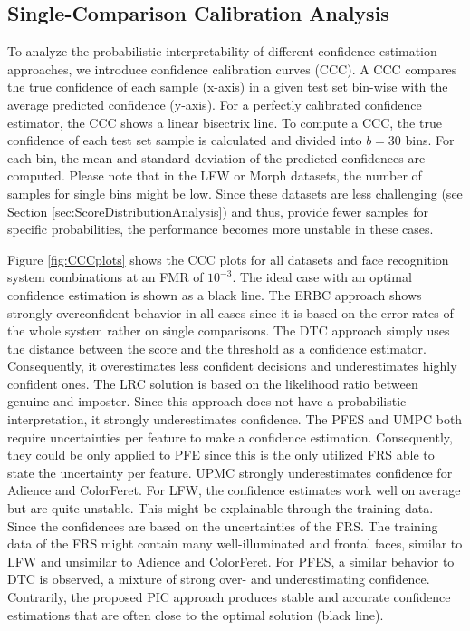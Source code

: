 \documentclass[10pt,twocolumn,letterpaper]{article}
\begin{document}
\subsection{Single-Comparison Calibration Analysis}
\label{sec:SingeComparisonCalibrationAnalysis}

To analyze the probabilistic interpretability of different confidence estimation approaches, we introduce confidence calibration curves (CCC).
A CCC compares the true confidence of each sample (x-axis) in a given test set bin-wise with the average predicted confidence (y-axis).
For a perfectly calibrated confidence estimator, the CCC shows a linear bisectrix line.
To compute a CCC, the true confidence of each test set sample is calculated and divided into $b=30$ bins.
For each bin, the mean and standard deviation of the predicted confidences are computed.
Please note that in the LFW or Morph datasets, the number of samples for single bins might be low.
Since these datasets are less challenging (see Section \ref{sec:ScoreDistributionAnalysis}) and thus, provide fewer samples for specific probabilities, the performance becomes more unstable in these cases.

Figure \ref{fig:CCCplots} shows the CCC plots for all datasets and face recognition system combinations at an FMR of $10^{-3}$.
The ideal case with an optimal confidence estimation is shown as a black line.
The ERBC approach shows strongly overconfident behavior in all cases since it is based on the error-rates of the whole system rather on single comparisons.
The DTC approach simply uses the distance between the score and the threshold as a confidence estimator.
Consequently, it overestimates less confident decisions and underestimates highly confident ones.
The LRC solution is based on the likelihood ratio between genuine and imposter.
Since this approach does not have a probabilistic interpretation, it strongly underestimates confidence.
The PFES and UMPC both require uncertainties per feature to make a confidence estimation.
Consequently, they could be only applied to PFE since this is the only utilized FRS able to state the uncertainty per feature.
UPMC strongly underestimates confidence for Adience and ColorFeret.
For LFW, the confidence estimates work well on average but are quite unstable.
This might be explainable through the training data.
Since the confidences are based on the uncertainties of the FRS.
The training data of the FRS might contain many well-illuminated and frontal faces, similar to LFW and unsimilar to Adience and ColorFeret.
For PFES, a similar behavior to DTC is observed, a mixture of strong over- and underestimating confidence.
Contrarily, the proposed PIC approach produces stable and accurate confidence estimations that are often close to the optimal solution (black line).
\end{document}
